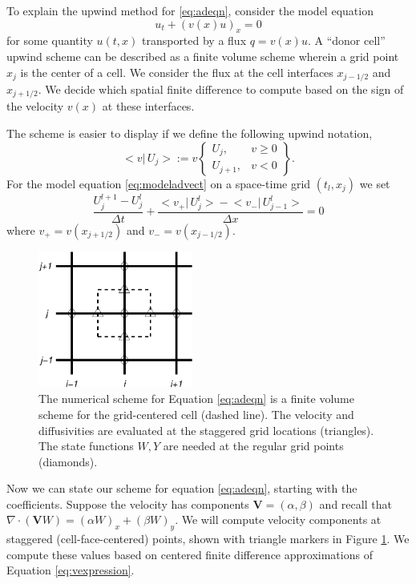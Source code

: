 \documentclass[12pt,final]{amsart}%
\newcommand\bV{\mathbf{V}}
\newcommand{\Div}{\nabla\cdot}
\begin{document}
To explain the upwind method for \eqref{eq:adeqn}, consider the model equation
\begin{equation} \label{eq:modeladvect}
u_t + (v(x) u)_x = 0
\end{equation}
for some quantity $u(t,x)$ transported by a flux $q = v(x) u$.  A ``donor cell'' upwind scheme can be described as a finite volume scheme \citep{LeVeque} wherein a grid point $x_j$ is the center of a cell.  We consider the flux at the cell interfaces $x_{j-1/2}$ and $x_{j+1/2}$.  We decide which spatial finite difference to compute based on the sign of the velocity $v(x)$ at these interfaces.

The scheme is easier to display if we define the following upwind notation,
\newcommand{\up}[2]{\big<#1\big|\,#2\big>}
	$$\up{v}{U_j} := v \begin{Bmatrix} U_j, & v \ge 0 \\ U_{j+1}, & v < 0 \end{Bmatrix}.$$
For the model equation \eqref{eq:modeladvect} on a space-time grid $(t_l,x_j)$ we set
\begin{equation}\label{eq:modelfdadvect}
\frac{U_j^{l+1} - U_j^l}{\Delta t} + \frac{\up{v_+}{U_j^l} - \up{v_-}{U_{j-1}^l}}{\Delta x} = 0
\end{equation}
where $v_+ = v(x_{j+1/2})$ and $v_-=v(x_{j-1/2})$.

\begin{figure}[ht]
\centering
\includegraphics[width=2.0in,keepaspectratio=true]{figs/diffstencil}
\bigskip
\caption{The numerical scheme for Equation \eqref{eq:adeqn} is a finite volume scheme for the grid-centered cell (dashed line).  The velocity and diffusivities are evaluated at the staggered grid locations (triangles).  The state functions $W,Y$ are needed at the regular grid points (diamonds).}
\label{fig:stencil}
\end{figure}

Now we can state our scheme for equation \eqref{eq:adeqn}, starting with the coefficients.  Suppose the velocity has components $\bV = (\alpha,\beta)$ and recall that $\Div \left(\bV W\right) = (\alpha W)_x + (\beta W)_y$.  We will compute velocity components at staggered (cell-face-centered) points, shown with triangle markers in Figure \ref{fig:stencil}.  We compute these values based on centered finite difference approximations of Equation \eqref{eq:vexpression}.
\end{document}

